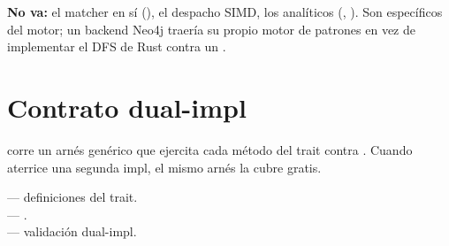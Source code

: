 \textbf{No va:} el matcher en sí (),
el despacho SIMD, los analíticos (,
). Son específicos del motor; un backend Neo4j
traería su propio motor de patrones en vez de implementar el DFS
de Rust contra un .

\section{Contrato dual-impl}

 corre
un arnés genérico  que
ejercita cada método del trait contra . Cuando
aterrice una segunda impl, el mismo arnés la cubre gratis.

\begin{inthecode}
 --- definiciones
del trait.\\
 ---
.\\
 ---
validación dual-impl.
\end{inthecode}
